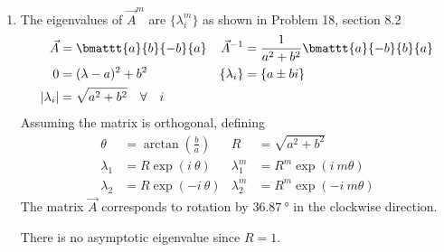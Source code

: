 \begin{enumerate}
\begin{enumerate}
              \item The eigenvalues of $ \vec{A}^m $ are $ \{\lambda_i^m\} $ as shown in
                    Problem 18, section 8.2
                    \begin{align}
                        \vec{A}       & = \bmattt{a}{b}{-b}{a}                   &
                        \vec{A}^{-1}  & = \frac{1}{a^2 + b^2}
                        \bmattt{a}{-b}{b}{a}                                       \\
                        0             & = (\lambda - a)^2 + b^2                  &
                        \{\lambda_i\} & = \{a \pm bi\}                             \\
                        |\lambda_i|   & = \sqrt{a^2 + b^2} \quad \forall \quad i
                    \end{align}
                    Assuming the matrix is orthogonal, defining
                    \begin{align}
                        \theta      & = \arctan\left( \frac{b}{a} \right) &
                        R           & = \sqrt{a^2 + b^2}                    \\
                        \lambda_1   & = R\exp(i\ \theta)                  &
                        \lambda_1^m & = R^m\exp(i\ m\theta)                 \\
                        \lambda_2   & = R\exp(-i\ \theta)                 &
                        \lambda_2^m & = R^m\exp(-i\ m\theta)
                    \end{align}
                    The matrix $ \vec{A} $ corresponds to rotation by
                    $ \SI{36.87}{\degree} $ in the clockwise direction. \par
                    There is no asymptotic eigenvalue since $ R = 1 $.


\end{enumerate}
\end{enumerate}
